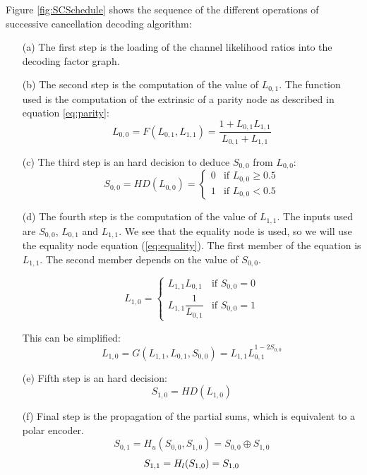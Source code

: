 Figure \ref{fig:SCSchedule} shows the sequence of the different operations of successive cancellation decoding algorithm:
\begin{itemize}
\item[(a)] The first step is the loading of the channel likelihood ratios into the decoding factor graph.
\item[(b)] The second step is the computation of the value of $L_{0,1}$. The function used is the computation of the extrinsic of a parity node as described in equation \ref{eq:parity}:
\begin{equation}
L_{0,0} = F(L_{0,1}, L_{1,1}) = \dfrac{1+L_{0,1}L_{1,1}}{L_{0,1}+L_{1,1}}
\end{equation}
\item[(c)] The third step is an hard decision to deduce $S_{0,0}$ from $L_{0,0}$:
 \[
    S_{0,0}=HD(L_{0,0})=
    	\begin{cases} 
    		0 & \text{if }L_{0,0}\geq0.5\\
    		1 & \text{if }L_{0,0}<0.5
    		\end{cases}
  \]
\item[(d)] The fourth step is the computation of the value of $L_{1,1}$. The inputs used are $S_{0,0}$, $L_{0,1}$ and $L_{1,1}$. We see that the equality node is used, so we will use the equality node equation (\ref{eq:equality}). The first member of the equation is $L_{1,1}$. The second member depends on the value of $S_{0,0}$.

\[
	L_{1,0} = 
	\begin{cases} 
	L_{1,1}L_{0,1} & \text{if }S_{0,0} = 0\\
	L_{1,1}\dfrac{1}{L_{0,1}} & \text{if }S_{0,0} = 1
	\end{cases}
\]

This can be simplified:
\begin{equation}
L_{1,0} = G(L_{1,1},L_{0,1},S_{0,0}) = L_{1,1}L_{0,1}^{1 - 2S_{0,0}}
\end{equation}
\item[(e)] Fifth step is an hard decision: 
\begin{equation*}
S_{1,0}=HD(L_{1,0})
\end{equation*}
\item[(f)] Final step is the propagation of the partial sums, which is equivalent to a polar encoder.
\begin{equation}
S_{0,1} = H_u(S_{0,0},S_{1,0}) =S_{0,0}\oplus S_{1,0}
\end{equation}	
\begin{equation}
S_{1,1} = H_l(S_{1,0}) = S_{1,0}\\
\end{equation}

	
\end{itemize}
